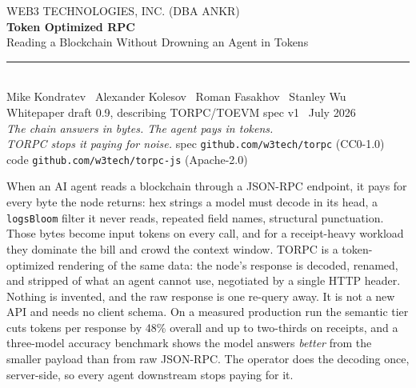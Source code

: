 \documentclass[11pt]{article}
\newcommand{\code}[1]{\texttt{#1}}
\begin{document}
\begin{titlepage}
\centering
\vspace*{1.1in}
{\sffamily\small\color{ankrgrey} WEB3 TECHNOLOGIES, INC. \enskip(DBA ANKR)}\\[2.4em]
{\sffamily\bfseries\Huge\color{ankrink} Token Optimized RPC}\\[0.6em]
{\sffamily\LARGE\color{ankrblue} Reading a Blockchain Without Drowning an Agent in Tokens}\\[1.5em]
{\color{ankrline}\rule{0.45\textwidth}{1pt}}\\[1.5em]
{\sffamily\normalsize\color{ankrgrey} Mike Kondratev \textbullet\ Alexander Kolesov \textbullet\ Roman Fasakhov \textbullet\ Stanley Wu}\\[0.8em]
{\sffamily\normalsize\color{ankrgrey} Whitepaper draft 0.9, describing TORPC/TOEVM spec v1 \textbullet\ July 2026}\\[3.2em]
{\itshape\large The chain answers in bytes. The agent pays in tokens.\\[0.2em] TORPC stops it paying for noise.}
\vfill
{\sffamily\footnotesize\color{ankrgrey} spec \code{github.com/w3tech/torpc} (CC0-1.0) \enskip\textbullet\enskip code \code{github.com/w3tech/torpc-js} (Apache-2.0)}
\end{titlepage}

\begin{onepara}
When an AI agent reads a blockchain through a JSON-RPC endpoint, it pays for every byte the node returns: hex strings a model must decode in its head, a \code{logsBloom} filter it never reads, repeated field names, structural punctuation. Those bytes become input tokens on every call, and for a receipt-heavy workload they dominate the bill and crowd the context window. TORPC is a token-optimized rendering of the same data: the node's response is decoded, renamed, and stripped of what an agent cannot use, negotiated by a single HTTP header. Nothing is invented, and the raw response is one re-query away. It is not a new API and needs no client schema. On a measured production run the semantic tier cuts tokens per response by 48\% overall and up to two-thirds on receipts, and a three-model accuracy benchmark shows the model answers \emph{better} from the smaller payload than from raw JSON-RPC. The operator does the decoding once, server-side, so every agent downstream stops paying for it.
\end{onepara}
\end{document}
